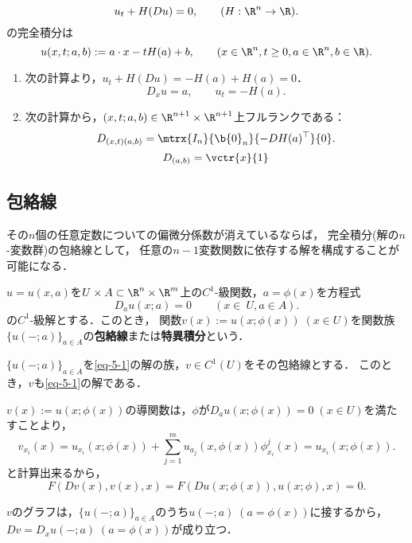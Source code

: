 \documentclass[uplatex,dvipdfmx]{jsreport}
\begin{document}
\begin{example}
    \[u_t+H(Du)=0,\qquad(H:\R^n\to\R).\]
    の完全積分は
    \[u(x,t;a,b):=a\cdot x-tH(a)+b,\qquad(x\in\R^n,t\ge0,a\in\R^n,b\in\R).\]
\end{example}
\begin{Proof}[［確認］]\mbox{}
    \begin{enumerate}
        \item 次の計算より，$u_t+H(Du)=-H(a)+H(a)=0$．
        \[D_xu=a,\qquad u_t=-H(a).\]
        \item 次の計算から，$(x,t;a,b)\in\R^{n+1}\times \R^{n+1}$上フルランクである：
        \[D_{(x,t)(a,b)}=\mtrx{I_n}{\b{0}_n}{-DH(a)^\top}{0}.\]
        \[D_{(a,b)}=\vctr{x}{1}\]
    \end{enumerate}
\end{Proof}

\subsection{包絡線}

\begin{tcolorbox}[colframe=ForestGreen, colback=ForestGreen!10!white,breakable,colbacktitle=ForestGreen!40!white,coltitle=black,fonttitle=\bfseries\sffamily,
title=]
    その$n$個の任意定数についての偏微分係数が消えているならば，
    完全積分(解の$n$-変数群)の包絡線として，
    任意の$n-1$変数関数に依存する解を構成することが可能になる．
\end{tcolorbox}

\begin{definition}
    $u=u(x,a)$を$U\times A\subset\R^n\times\R^m$上の$C^1$-級関数，$a=\phi(x)$を方程式
    \[D_au(x;a)=0\qquad(x\in\ U,a\in A).\]
    の$C^1$-級解とする．このとき，
    関数$v(x):=u(x;\phi(x))\;(x\in U)$を関数族$\{u(-;a)\}_{a\in A}$の\textbf{包絡線}または\textbf{特異積分}という．
\end{definition}


\begin{theorem}[包絡線も解である]
    $\{u(-;a)\}_{a\in A}$を\ref{eq-5-1}の解の族，$v\in C^1(U)$をその包絡線とする．
    このとき，$v$も\ref{eq-5-1}の解である．
\end{theorem}
\begin{Proof}
    $v(x):=u(x;\phi(x))$の導関数は，$\phi$が$D_au(x;\phi(x))=0\;(x\in U)$を満たすことより，
    \[v_{x_i}(x)=u_{x_i}(x;\phi(x))+\sum_{j=1}^mu_{a_j}(x,\phi(x))\phi^j_{x_i}(x)=u_{x_i}(x;\phi(x)).\]
    と計算出来るから，
    \[F(Dv(x),v(x),x)=F(Du(x;\phi(x)),u(x;\phi),x)=0.\]
\end{Proof}
\begin{remarks}
    $v$のグラフは，$\{u(-;a)\}_{a\in A}$のうち$u(-;a)\;(a=\phi(x))$に接するから，$Dv=D_xu(-;a)\;(a=\phi(x))$が成り立つ．
\end{remarks}
\end{document}
